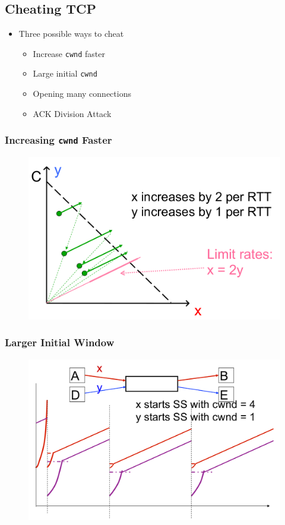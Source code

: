 \subsection{Cheating TCP}
\begin{itemize}[nosep]
    \item Three possible ways to cheat
          \begin{itemize}[nosep]
              \item Increase \texttt{cwnd} faster
              \item Large initial \texttt{cwnd}
              \item Opening many connections
              \item ACK Division Attack
          \end{itemize}
\end{itemize}
\subsubsection{Increasing \texttt{cwnd} Faster}
\begin{figure}[H]
    \includegraphics[width=\textwidth]{lazy/cwnd-faster.png}
\end{figure}
\subsubsection{Larger Initial Window}
\begin{figure}[H]
    \includegraphics[width=\textwidth]{lazy/larger-initial-window.png}
\end{figure}
